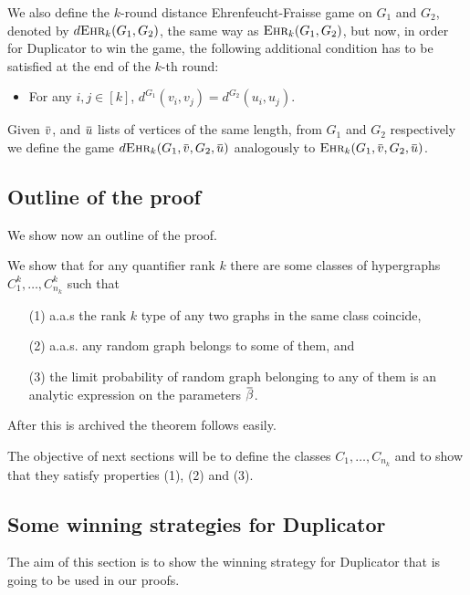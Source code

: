 \documentclass[12pt,notitlepage,a4paper]{article}
\theoremstyle{definition}
\newcommand{\overbar}[1]{\mkern 1.5mu\overline{\mkern-1.5mu#1\mkern-1.5mu}\mkern 1.5mu}
\newcommand{\ehr}{\textsc{Ehr}}
\begin{document}
We also define the $k$-round distance Ehrenfeucht-Fraisse game on 
$G_1$ and $G_2$, denoted by $d\ehr_k(G_1,G_2)$, the same way as
$\ehr_k(G_1,G_2)$, but now, in order for Duplicator to win the
game, the following additional condition has to be satisfied 
at the end of the $k$-th round:
\begin{itemize}
	\item For any $i,j\in [k]$, $d^{G_1}(v_i,v_j)=d^{G_2}(u_i,u_j)$.
\end{itemize}

Given $\overbar{v}$, and $\overbar{u}$ lists of vertices of the same length,
from $G_1$ and $G_2$ respectively we define the game 
$d\ehr_k(G_1,\overbar{v},G_2,\overbar{u})$ analogously to 
$\ehr_k(G_1,\overbar{v},G_2,\overbar{u})$.








\subsection{Outline of the proof}

We show now an outline of the proof. \par 
We show that for any quantifier rank $k$ there are some classes of
hypergraphs 
$C^k_1,\dots, C^k_{n_k}$ such that
\begin{itemize}[noitemsep, topsep=0pt]
	\item[(1)] a.a.s the rank $k$ type of any two graphs in the same class coincide, 
	\item[(2)] a.a.s. any random graph belongs to some of them, and
	\item[(3)] the limit probability of random graph belonging to 
	any of them is an analytic expression on the parameters $\overbar{\beta}$. 
\end{itemize}

After this is archived the theorem follows easily. 

The objective of next sections will be to define the classes 
$C_1,\dots, C_{n_k}$ and to show that they satisfy properties (1), (2) and (3).


\subsection{Some winning strategies for Duplicator}

The aim of this section is to show the winning strategy
for Duplicator that is going to be used in our proofs. \par
\end{document}
